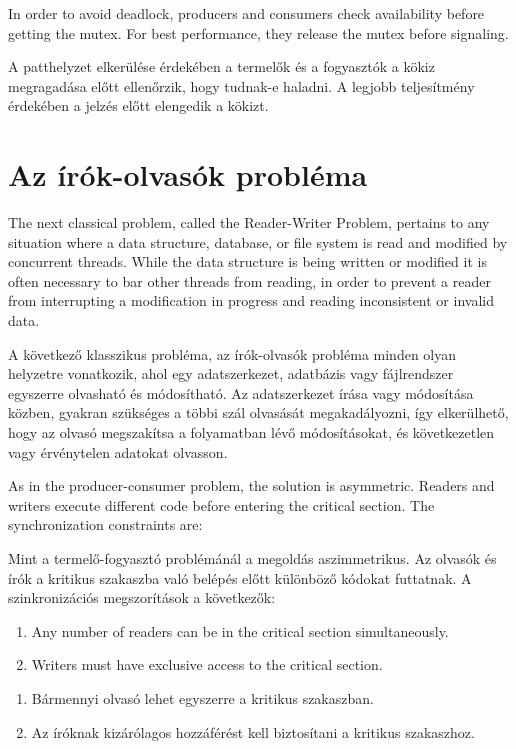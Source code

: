 \documentclass{book}
\begin{document}
In order to avoid deadlock, producers and consumers check
availability before getting the mutex.  For best performance,
they release the mutex before signaling.


A patthelyzet elkerülése érdekében a termelők és
a fogyasztók a kökiz megragadása előtt ellenőrzik, hogy tudnak-e haladni.
A legjobb teljesítmény érdekében a jelzés előtt elengedik a kökizt.


\section{Az írók-olvasók probléma} 

The next classical problem, called the Reader-Writer Problem, pertains
to any situation where a data structure, database, or file system is
read and modified by concurrent threads.  While the data structure is
being written or modified it is often necessary to bar other threads
from reading, in order to prevent a reader from interrupting a
modification in progress and reading inconsistent or invalid data.

A következő klasszikus probléma, az írók-olvasók probléma minden
olyan helyzetre vonatkozik, ahol egy adatszerkezet, adatbázis vagy
fájlrendszer egyszerre olvasható és módosítható.
Az adatszerkezet írása vagy módosítása közben, gyakran szükséges a többi
szál olvasását megakadályozni, így elkerülhető, hogy az olvasó megszakítsa
a folyamatban lévő módosításokat, és következetlen vagy érvénytelen adatokat olvasson.


As in the producer-consumer problem, the solution is asymmetric.
Readers and writers execute different code before entering the
critical section.  The synchronization constraints are:

Mint a termelő-fogyasztó problémánál a megoldás aszimmetrikus.
Az olvasók és írók a kritikus szakaszba való belépés előtt
különböző kódokat futtatnak. A szinkronizációs megszorítások a következők:

\begin{enumerate}

\item Any number of readers can be in the critical section
simultaneously.

\item Writers must have exclusive access to the critical section.

\end{enumerate}

\begin{enumerate}

\item Bármennyi olvasó lehet egyszerre a kritikus szakaszban.
\item Az íróknak kizárólagos hozzáférést kell biztosítani a kritikus szakaszhoz.

\end{enumerate}
\end{document}
